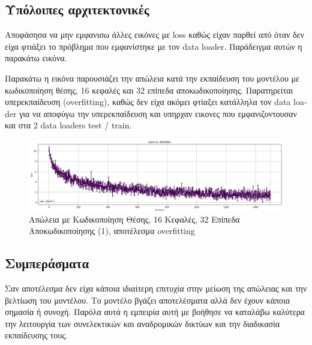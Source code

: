 \documentclass[conference]{IEEEtran}
\begin{document}
\subsection{Υπόλοιπες αρχιτεκτονικές}

Αποφάσησα να μην εμφανισω άλλες εικόνες με loss καθώς είχαν παρθεί από όταν δεν είχα φτιάξει το πρόβλημα που εμφανίστηκε με τον data loader. Παράδειγμα αυτών η παρακάτω εικόνα.

Παρακάτω η εικόνα παρουσιάζει την απώλεια κατά την εκπαίδευση του μοντέλου με κωδικοποίηση θέσης, 16 κεφαλές και 32 επίπεδα αποκωδικοποίησης. Παρατηρείται υπερεκπαίδευση (\textlatin{overfitting}), καθώς δεν είχα ακόμει φτίαξει κατάλληλα τον \textlatin{data loader} για να αποφύγω την υπερεκπαίδευση και υπηρχαν εικονες που εμφανιζοντουσαν και στα 2 \textlatin{data loaders test / train}.

\begin{figure}[htbp]
    \centerline{\includegraphics[width=0.8\linewidth]{3.png}}
    \caption{Απώλεια με Κωδικοποίηση Θέσης, 16 Κεφαλές, 32 Επίπεδα Αποκωδικοποίησης (1), αποτέλεσμα overfitting}
\end{figure}

\subsection{Συμπεράσματα}

Σαν αποτέλεσμα δεν είχα κάποια ιδιαίτερη επιτυχία στην μείωση της απώλειας και την βελτίωση του μοντέλου. Το μοντέλο βγάζει αποτελέσματα αλλά δεν έχουν κάποια σημασία ή συνοχή. Παρόλα αυτά η εμπειρία αυτή με βοήθησε να καταλάβω καλύτερα την λειτουργία των συνελεκτικών και αναδρομικών δικτύων και την διαδικασία εκπαίδευσης τους. 
\end{document}
